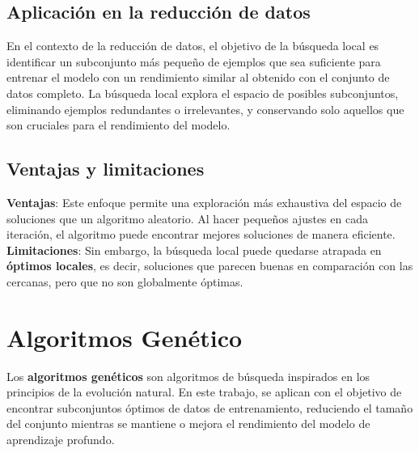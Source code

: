 \subsection{Aplicación en la reducción de datos}\label{subsec:aplicacion-en-la-reduccion-de-datos2}
En el contexto de la reducción de datos, el objetivo de la búsqueda local es identificar un subconjunto más pequeño de
ejemplos que sea suficiente para entrenar el modelo con un rendimiento similar al obtenido con el conjunto de datos
completo.
La búsqueda local explora el espacio de posibles subconjuntos, eliminando ejemplos redundantes o irrelevantes, y
conservando solo aquellos que son cruciales para el rendimiento del modelo.

\subsection{Ventajas y limitaciones}\label{subsec:ventajas-y-limitaciones}
\textbf{Ventajas}: Este enfoque permite una exploración más exhaustiva del espacio de soluciones que un algoritmo
aleatorio.
Al hacer pequeños ajustes en cada iteración, el algoritmo puede encontrar mejores soluciones de manera eficiente.
\textbf{Limitaciones}: Sin embargo, la búsqueda local puede quedarse atrapada en \textbf{óptimos locales}, es decir,
soluciones que parecen buenas en comparación con las cercanas, pero que no son globalmente óptimas.

\section{Algoritmos Genético}\label{sec:algoritmos-geneticos}
Los \textbf{algoritmos genéticos} son algoritmos de búsqueda inspirados en los principios de la evolución natural.
En este trabajo, se aplican con el objetivo de encontrar subconjuntos óptimos de datos de entrenamiento, reduciendo el
tamaño del conjunto mientras se mantiene o mejora el rendimiento del modelo de aprendizaje profundo.

